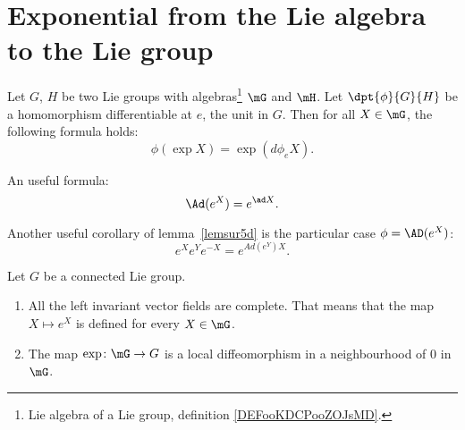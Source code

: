 \section{Exponential from the Lie algebra to the Lie group}

\begin{lemma}		\label{lemsur5d}
    Let $G$, $H$ be two Lie groups with algebras\footnote{Lie algebra of a Lie group, definition \ref{DEFooKDCPooZOJsMD}.} $\mG$ and $\mH$. Let $\dpt{\phi}{G}{H}$ be a homomorphism differentiable at $e$, the unit in $G$. Then for all $X\in\mG$, the following formula holds:
	\[
		\phi(\exp X)=\exp(d\phi_eX).
	\]
\end{lemma}

\begin{corollary}\label{Ad_e}
An useful formula:
\[
   \Ad(e^X)=e^{\ad X}.
\]
\end{corollary}

\begin{corollary}
Another useful corollary of lemma~\ref{lemsur5d} is the particular case $\phi=\AD(e^X)$:
\[
   e^Xe^Ye^{-X}=e^{Ad(e^Y)X}.
\]
\label{cor:eXeYe-X}
\end{corollary}

\begin{proposition}
	Let $G$ be a connected Lie group.
	\begin{enumerate}

		\item
			All the left invariant vector fields are complete. That means that the map $X\mapsto  e^{X}$ is defined for every $X\in \mG$.
		\item
			The map $\exp\colon \mG\to G$ is a local diffeomorphism in a neighbourhood of $0$ in $\mG$.
	\end{enumerate}
\end{proposition}

